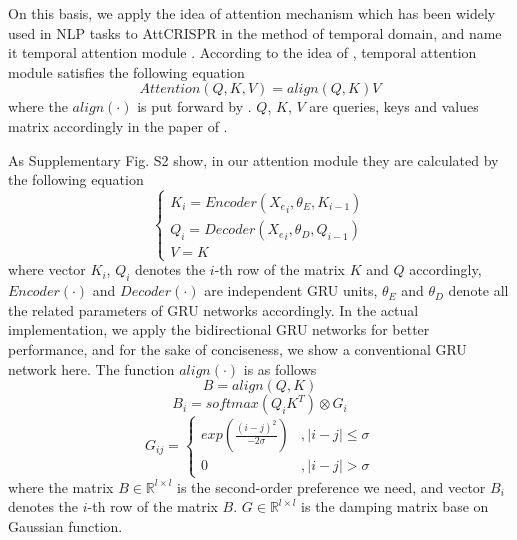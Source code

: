 \documentclass{bioinfo}
\begin{document}
On this basis, we apply the idea of attention mechanism which has been widely used in NLP tasks to AttCRISPR in the method of temporal domain, 
and name it temporal attention module \citep{luong2015effective,vaswani2017attention}.
According to the idea of \citeauthor{vaswani2017attention}, temporal attention module satisfies the following equation
\begin{equation}
Attention(Q,K,V)=align(Q,K)V\label{eq:13}
\end{equation}
where the $align(\cdot)$ is put forward by \citeauthor{luong2015effective}. 
$Q$, $K$, $V$ are queries, keys and values matrix accordingly in the paper of \citeauthor{vaswani2017attention}. 

As Supplementary Fig. S2 show, in our attention module they are calculated by the following equation
\begin{equation}
\left\{\begin{array}{l}
K_i=Encoder({X_e}_i,\theta_E,K_{i-1})
\\ Q_i=Decoder({X_e}_i,\theta_D,Q_{i-1})
\\V=K 
\end{array}\right.\label{eq:14}
\end{equation}
where vector $K_i$, $Q_i$ denotes the $i$-th row of the matrix $K$ and $Q$ accordingly, $Encoder(\cdot)$ and $Decoder(\cdot)$ are independent GRU units, $\theta_E$ and $\theta_D$ denote all the related parameters of GRU networks accordingly. 
In the actual implementation, we apply the bidirectional GRU networks for better performance, and for the sake of conciseness, we show a conventional GRU network here. 
The function $align(\cdot)$ is as follows
\begin{equation}
B=align(Q,K)\label{eq:16}
\end{equation}
\begin{equation}
B_i=softmax(Q_iK^T)\otimes G_i\label{eq:17}
\end{equation}
\begin{equation}
G_{ij}=\left\{\begin{matrix}
exp(\frac{(i-j)^2}{-2\sigma})&,\left | i-j \right |\leqslant \sigma
\\ 0&,\left | i-j \right |>  \sigma
\end{matrix}\right.\label{eq:18}
\end{equation}
where the matrix $B\in\mathbb{R}^{l\times l}$ is the second-order preference we need, and vector $B_i$ denotes the $i$-th row of the matrix $B$. 
$G\in\mathbb{R}^{l\times l}$ is the damping matrix base on Gaussian function. 
\end{document}
